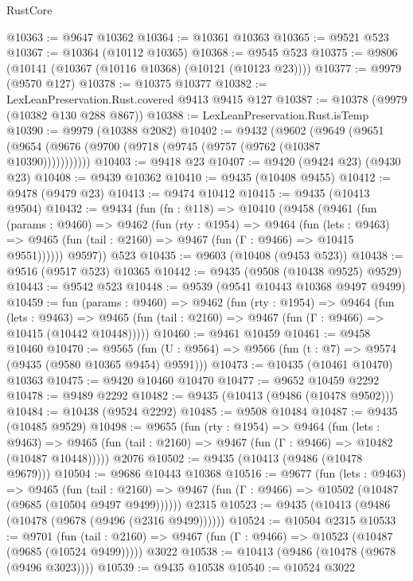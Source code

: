 \begin{lexlean}{RustCore}
\begin{coremodule}
@10363 := @9647 @10362
@10364 := @10361 @10363
@10365 := @9521 @523
@10367 := @10364 (@10112 @10365)
@10368 := @9545 @523
@10375 := @9806 (@10141 (@10367 (@10116 @10368) (@10121 (@10123 @23))))
@10377 := @9979 (@9570 @127)
@10378 := @10375 @10377
@10382 := LexLeanPreservation.Rust.covered @9413 @9415 @127
@10387 := @10378 (@9979 (@10382 @130 @288 @867))
@10388 := LexLeanPreservation.Rust.isTemp
@10390 := @9979 (@10388 @2082)
@10402 := @9432
    (@9602 (@9649 (@9651 (@9654 (@9676 (@9700 (@9718 (@9745 (@9757 (@9762 (@10387 @10390)))))))))))
@10403 := @9418 @23
@10407 := @9420 (@9424 @23) (@9430 @23)
@10408 := @9439 @10362
@10410 := @9435 (@10408 @9455)
@10412 := @9478 (@9479 @23)
@10413 := @9474 @10412
@10415 := @9435 (@10413 @9504)
@10432 := @9434
    (fun (fn : @118) =>
    @10410
      (@9458
        (@9461
          (fun (params : @9460) =>
          @9462
            (fun (rty : @1954) =>
            @9464
              (fun (lets : @9463) =>
              @9465 (fun (tail : @2160) => @9467 (fun (Γ : @9466) => @10415 @9551))))))
        @9597))
    @523
@10435 := @9603 (@10408 (@9453 @523))
@10438 := @9516 (@9517 @523) @10365
@10442 := @9435 (@9508 (@10438 @9525) @9529)
@10443 := @9542 @523
@10448 := @9539 (@9541 @10443 @10368 @9497 @9499)
@10459 := fun (params : @9460) =>
  @9462
    (fun (rty : @1954) =>
    @9464
      (fun (lets : @9463) =>
      @9465 (fun (tail : @2160) => @9467 (fun (Γ : @9466) => @10415 (@10442 @10448)))))
@10460 := @9461 @10459
@10461 := @9458 @10460
@10470 := @9565
    (fun (U : @9564) => @9566 (fun (t : @7) => @9574 (@9435 (@9580 @10365 @9454) @9591)))
@10473 := @10435 (@10461 @10470) @10363
@10475 := @9420 @10460 @10470
@10477 := @9652 @10459 @2292
@10478 := @9489 @2292
@10482 := @9435 (@10413 (@9486 (@10478 @9502)))
@10484 := @10438 (@9524 @2292)
@10485 := @9508 @10484
@10487 := @9435 (@10485 @9529)
@10498 := @9655
    (fun (rty : @1954) =>
    @9464
      (fun (lets : @9463) =>
      @9465 (fun (tail : @2160) => @9467 (fun (Γ : @9466) => @10482 (@10487 @10448)))))
    @2076
@10502 := @9435 (@10413 (@9486 (@10478 @9679)))
@10504 := @9686 @10443 @10368
@10516 := @9677
    (fun (lets : @9463) =>
    @9465
      (fun (tail : @2160) =>
      @9467 (fun (Γ : @9466) => @10502 (@10487 (@9685 (@10504 @9497 @9499))))))
    @2315
@10523 := @9435 (@10413 (@9486 (@10478 (@9678 (@9496 (@2316 @9499))))))
@10524 := @10504 @2315
@10533 := @9701
    (fun (tail : @2160) => @9467 (fun (Γ : @9466) => @10523 (@10487 (@9685 (@10524 @9499)))))
    @3022
@10538 := @10413 (@9486 (@10478 (@9678 (@9496 @3023))))
@10539 := @9435 @10538
@10540 := @10524 @3022

\end{coremodule}
\end{lexlean}
